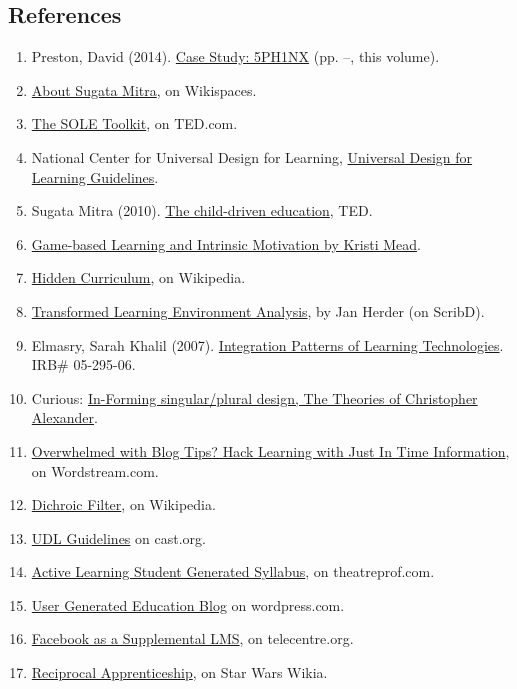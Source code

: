 \subsection{References}

\begin{enumerate}
\item
  Preston, David (2014). \href{http://peeragogy.org/case-study-5ph1nx/}{Case Study:
  5PH1NX} (pp. \pageref{sphinx-beginning}--\pageref{sphinx-end}, this volume).
\item
  \href{http://sugatam.wikispaces.com/}{About Sugata Mitra}, on Wikispaces.
\item
  \href{http://www.ted.com/pages/sole\_toolkit}{The SOLE Toolkit}, on TED.com.
\item National Center for Universal Design for Learning,
  \href{http://www.udlcenter.org/aboutudl/udlguidelines}{Universal Design for
  Learning Guidelines}.
\item Sugata Mitra (2010).
  \href{http://www.ted.com/talks/sugata\_mitra\_the\_child\_driven\_education.html}{The child-driven education}, TED.
\item
  \href{http://www.academia.edu/1137269/Game-based\_Learning\_and\_Intrinsic\_Motivation}{Game-based
  Learning and Intrinsic Motivation by Kristi Mead}.
\item
  \href{http://en.wikipedia.org/wiki/Hidden\_curriculum}{Hidden Curriculum}, on Wikipedia.
\item
  \href{http://www.scribd.com/doc/181089012/Transformed-Learning-Environment-Analysis}{Transformed
  Learning Environment Analysis}, by Jan Herder (on ScribD).
\item
  Elmasry, Sarah Khalil (2007). \href{http://scholar.lib.vt.edu/theses/available/etd-09232007-220306/unrestricted/SElmasryETDbodytext.pdf}{Integration
  Patterns of Learning Technologies}. IRB\# 05-295-06.
\item
  Curious: \href{http://nourdiab.wordpress.com/2011/02/23/the-theories-of-christopher-alexander/}{In-Forming
  singular/plural design, The Theories of Christopher Alexander}.
\item
  \href{http://www.wordstream.com/blog/ws/2013/10/02/just-in-time-information-hacks}{Overwhelmed
  with Blog Tips? Hack Learning with Just In Time Information}, on Wordstream.com.
\item
  \href{http://en.wikipedia.org/wiki/Dichroic\_filter}{Dichroic Filter}, on Wikipedia.
\item \href{http://www.cast.org/library/UDLguidelines/}{UDL Guidelines} on cast.org.
\item
  \href{http://www.theatreprof.com/2011/active-learning-student-generated-syllabus/}{Active
  Learning Student Generated Syllabus}, on theatreprof.com.
\item
  \href{http://usergeneratededucation.wordpress.com/}{User Generated
  Education Blog} on wordpress.com.
\item
  \href{http://community.telecentre.org/profiles/blogs/facebook-as-a-supplemental-lms}{Facebook
  as a Supplemental LMS}, on telecentre.org.
\item
  \href{http://starwars.wikia.com/wiki/Reciprocal\_apprenticeship}{Reciprocal
  Apprenticeship}, on Star Wars Wikia.
\end{enumerate}
